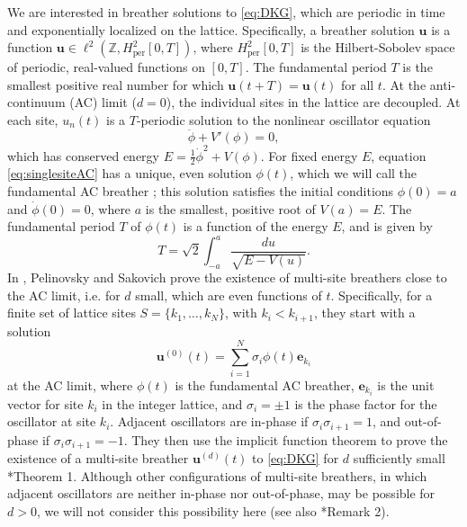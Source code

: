 \documentclass[12pt,reqno]{amsart}
\def\Z{{\mathbb Z}}
\def\per{\textrm{per}}
\newcommand{\evec}{\mathbf{e}}
\newcommand{\uvec}{\mathbf{u}}
\theoremstyle{definition}
\begin{document}
We are interested in breather solutions to \cref{eq:DKG}, which are periodic in time and exponentially localized on the lattice. Specifically, a breather solution $\uvec$ is a function $\uvec \in \ell^2(\Z, H^2_\per[0,T])$, where $H^2_\per[0,T]$ is the Hilbert-Sobolev space of periodic, real-valued functions on $[0,T]$. 
The fundamental period $T$ is the smallest positive real number for which $\uvec(t+T) = \uvec(t)$ for all $t$. At the anti-continuum (AC) limit ($d = 0$), the individual sites in the lattice are decoupled. At each site, $u_n(t)$ is a $T$-periodic solution to the nonlinear oscillator equation
\begin{equation}\label{eq:singlesiteAC}
\ddot{\phi} + V'(\phi) = 0,
\end{equation}
which has conserved energy $E = \frac{1}{2}\dot{\phi}^2 + V(\phi)$. For fixed energy $E$, equation \cref{eq:singlesiteAC} has a unique, even solution $\phi(t)$, which we will call the fundamental AC breather \cite{Pelinovsky2012}; this solution satisfies the initial conditions $\phi(0) = a$ and $\dot{\phi}(0) = 0$, where $a$ is the smallest, positive root of $V(a) = E$. The fundamental period $T$ of $\phi(t)$ is a function of the energy $E$, and is given by
\begin{equation}\label{eq:ET}
T = \sqrt{2}\int_{-a}^a \frac{du}{\sqrt{E - V(u)}}.
\end{equation}
In \cite{Pelinovsky2012}, Pelinovsky and Sakovich prove the existence of multi-site breathers close to the AC limit, i.e. for $d$ small, which are even functions of $t$. Specifically, for a finite set of lattice sites $S = \{ k_1, \dots, k_N \}$, with $k_i < k_{i+1}$, they start with a solution
\begin{equation}
\uvec^{(0)}(t) = \sum_{i=1}^N \sigma_i \phi(t) \evec_{k_i}
\end{equation}
at the AC limit, where $\phi(t)$ is the fundamental AC breather, $\evec_{k_i}$ is the unit vector for site $k_i$ in the integer lattice, and $\sigma_i = \pm 1$ is the phase factor for the oscillator at site $k_i$. Adjacent oscillators are in-phase if $\sigma_i \sigma_{i+1} = 1$, and out-of-phase if $\sigma_i \sigma_{i+1} = -1$. They then use the implicit function theorem to prove the existence of a multi-site breather $\uvec^{(d)}(t)$ to \cref{eq:DKG} for $d$ sufficiently small \cite{Pelinovsky2012}*{Theorem 1}. Although other configurations of multi-site breathers, in which adjacent oscillators are neither in-phase nor out-of-phase, may be possible for $d > 0$, we will not consider this possibility here (see also \cite{Pelinovsky2012}*{Remark 2}).
\end{document}
